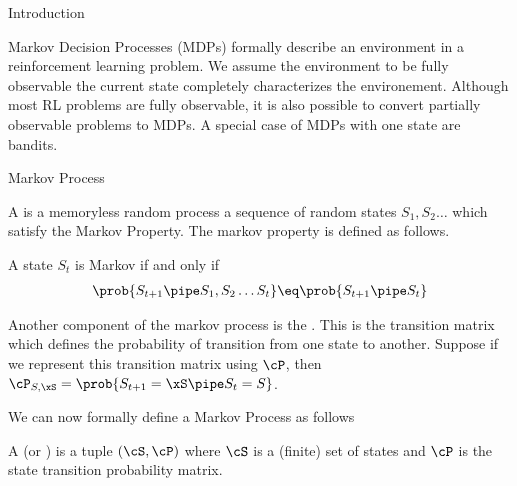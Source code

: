 \documentclass{article}
\begin{document}
\makeheader

\begin{ssection}{Introduction}

	Markov Decision Processes (MDPs) formally describe an environment in a
	reinforcement learning problem. We assume the environment to be fully
	observable \ie the current state completely characterizes the environement.
	Although most RL problems are fully observable, it is also possible to
	convert partially observable problems to MDPs. A special case of MDPs with
	one state are bandits.

\end{ssection}

\begin{ssection}{Markov Process}

	A  is a memoryless random process \ie a sequence of
	random states $S_1, S_2 \dots$ which satisfy the Markov Property. The
	markov property is defined as follows.

	\begin{definition}
		\label{def:markov-property}
		A state $S_t$ is Markov if and only if
		\begin{align*}
			\prob{S_{t + 1} \pipe S_1, S_2 \dots S_t} \eq \prob{S_{t + 1} \pipe S_t}
		\end{align*}
	\end{definition}
	Another component of the markov process is the . This is the transition matrix which defines the
	probability of transition from one state to another. Suppose if we
	represent this transition matrix using $\cP$, then $\cP_{S, \xS} =
	\prob{S_{t + 1} = \xS \pipe S_t = S}$.

	We can now formally define a Markov Process as follows
	\begin{definition}
		\label{def:markov-process}
		A  (or ) is a tuple $(\cS, \cP)$
		where $\cS$ is a (finite) set of states and $\cP$ is the state
		transition probability matrix.
	\end{definition}

\end{ssection}
\end{document}
